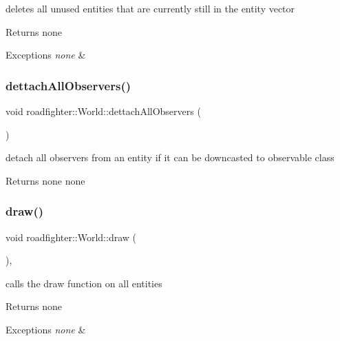 deletes all unused entities that are currently still in the entity vector \begin{DoxyReturn}{Returns}
none 
\end{DoxyReturn}

\begin{DoxyExceptions}{Exceptions}
{\em none} & \\
\hline
\end{DoxyExceptions}
\mbox{\label{classroadfighter_1_1World_a82f62356ff13d7b52372f5568803686d}} 
\subsubsection{\texorpdfstring{dettach\+All\+Observers()}{dettachAllObservers()}}
{\footnotesize\ttfamily void roadfighter\+::\+World\+::dettach\+All\+Observers (\begin{DoxyParamCaption}{ }\end{DoxyParamCaption})}

detach all observers from an entity if it can be downcasted to observable class \begin{DoxyReturn}{Returns}
none  none 
\end{DoxyReturn}
\mbox{\label{classroadfighter_1_1World_a90534263a154d6d7c1e8aef4e0138881}} 
\subsubsection{\texorpdfstring{draw()}{draw()}}
{\footnotesize\ttfamily void roadfighter\+::\+World\+::draw (\begin{DoxyParamCaption}{ }\end{DoxyParamCaption})\hspace{0.3cm}{\ttfamily [override]}, {\ttfamily [virtual]}}

calls the draw function on all entities \begin{DoxyReturn}{Returns}
none 
\end{DoxyReturn}

\begin{DoxyExceptions}{Exceptions}
{\em none} & \\
\hline
\end{DoxyExceptions}


